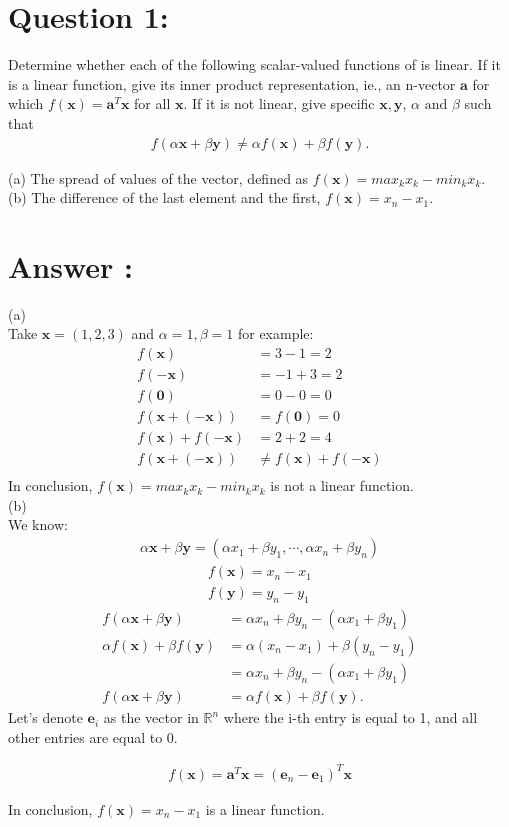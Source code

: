 \documentclass[a4paper,12pt]{article}
\newcommand{\R}{\mathbb{R}}
\begin{document}
\section*{Question 1:}
Determine whether each of the following scalar-valued functions of  is linear. If it is a linear function, give its inner product representation, ie.,
an n-vector \(\bm{a}\) for which \(f(\bm{x}) = \bm{a}^T\bm{x}\) for all \(\bm{x}\). If it is not linear, give specific \(\bm{x}, \bm{y}\), \(\alpha \text{ and } \beta\) such that
\begin{align*}
    f(\alpha \bm{x} + \beta \bm{y}) \neq \alpha f(\bm{x}) + \beta f(\bm{y}).
\end{align*}

(a) The spread of values of the vector, defined as \(f(\bm{x}) = max_kx_k - min_kx_k \). \\
(b) The difference of the last element and the first, \(f(\bm{x}) = x_n - x_1\). \\

\section*{Answer :}
(a)  \\
Take \(\bm{x} = (1, 2, 3)\) and \(\alpha = 1, \beta = 1\) for example:
\begin{align*}
    f(\bm{x}) &= 3 - 1 = 2 \\
    f(\bm{-x}) &= -1 + 3 = 2 \\
    f(\bm{0}) &= 0 - 0 = 0 \\
    f(\bm{x} + (-\bm{x})) &= f(\bm{0}) = 0 \\
    f(\bm{x}) + f(-\bm{x}) &= 2 + 2 = 4 \\
    f(\bm{x} + (-\bm{x})) &\neq f(\bm{x}) + f(-\bm{x}) \\
\end{align*}
In conclusion, \(f(\bm{x}) = max_kx_k - min_kx_k \) is not a linear function. \\

(b) \\
We know:
\begin{align*}
    \alpha \bm{x} + \beta \bm{y} = (\alpha x_1 + \beta y_1 , \cdots , \alpha x_n + \beta y_n)
\end{align*}
\begin{align*}
    f(\bm{x}) = x_n - x_1 \\
    f(\bm{y}) = y_n - y_1 
\end{align*}
\begin{align*}
    f(\alpha \bm{x} + \beta \bm{y}) &= \alpha x_n + \beta y_n - (\alpha x_1 + \beta y_1)  \\
    \alpha f(\bm{x}) + \beta f(\bm{y}) &= \alpha(x_n - x_1) + \beta(y_n - y_1)  \\
    &= \alpha x_n + \beta y_n - (\alpha x_1 + \beta y_1) \\
    f(\alpha \bm{x} + \beta \bm{y}) &= \alpha f(\bm{x}) + \beta f(\bm{y}).
\end{align*}
Let's denote \(\bm{e}_i\) as the vector in \(\R^n\) where the i-th entry is equal to 1, and all other entries are equal to 0.

\begin{align*}
    f(\bm{x}) = \bm{a}^T\bm{x} = (\bm{e}_n - \bm{e}_1)^T\bm{x}
\end{align*}

In conclusion, \(f(\bm{x}) = x_n - x_1\) is a linear function.
\end{document}
